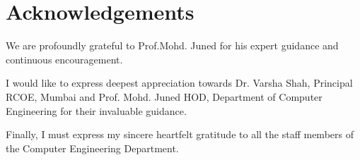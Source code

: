 \chapter*{Acknowledgements}
We are profoundly grateful to Prof.Mohd. Juned for his expert guidance and continuous encouragement. 
 
I would like to express deepest appreciation towards Dr. Varsha Shah, Principal RCOE, Mumbai and Prof. Mohd. Juned HOD, Department of Computer Engineering for their invaluable guidance.  

Finally, I must express my sincere heartfelt gratitude to all the staff members of the Computer Engineering Department.
